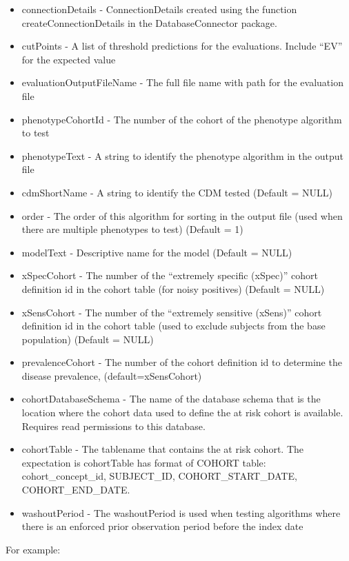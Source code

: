 \documentclass[
]{article}
\providecommand{\tightlist}{%
  \setlength{\itemsep}{0pt}\setlength{\parskip}{0pt}}
\begin{document}
\begin{itemize}
\tightlist
\item
  connectionDetails - ConnectionDetails created using the function
  createConnectionDetails in the DatabaseConnector package.
\item
  cutPoints - A list of threshold predictions for the evaluations.
  Include ``EV'' for the expected value
\item
  evaluationOutputFileName - The full file name with path for the
  evaluation file
\item
  phenotypeCohortId - The number of the cohort of the phenotype
  algorithm to test
\item
  phenotypeText - A string to identify the phenotype algorithm in the
  output file
\item
  cdmShortName - A string to identify the CDM tested (Default = NULL)
\item
  order - The order of this algorithm for sorting in the output file
  (used when there are multiple phenotypes to test) (Default = 1)
\item
  modelText - Descriptive name for the model (Default = NULL)
\item
  xSpecCohort - The number of the ``extremely specific (xSpec)'' cohort
  definition id in the cohort table (for noisy positives) (Default =
  NULL)
\item
  xSensCohort - The number of the ``extremely sensitive (xSens)'' cohort
  definition id in the cohort table (used to exclude subjects from the
  base population) (Default = NULL)
\item
  prevalenceCohort - The number of the cohort definition id to determine
  the disease prevalence, (default=xSensCohort)
\item
  cohortDatabaseSchema - The name of the database schema that is the
  location where the cohort data used to define the at risk cohort is
  available. Requires read permissions to this database.
\item
  cohortTable - The tablename that contains the at risk cohort. The
  expectation is cohortTable has format of COHORT table:
  cohort\_concept\_id, SUBJECT\_ID, COHORT\_START\_DATE,
  COHORT\_END\_DATE.
\item
  washoutPeriod - The washoutPeriod is used when testing algorithms
  where there is an enforced prior observation period before the index
  date
\end{itemize}

For example:
\end{document}
